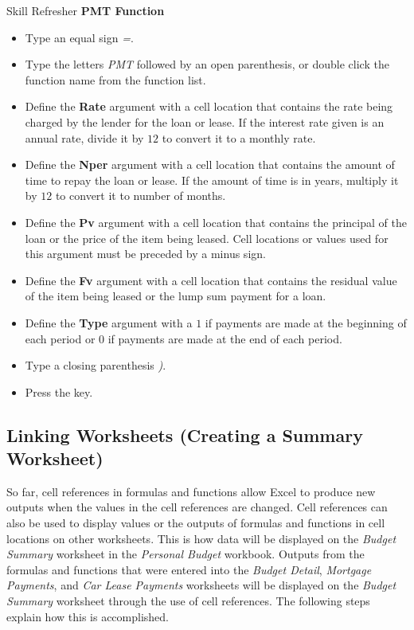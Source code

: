 \begin{center}
	\begin{sklbox}{Skill Refresher}
		\textbf{PMT Function}
		\\
		\begin{itemize}
			\setlength{\itemsep}{0pt}
			\setlength{\parskip}{0pt}
			\setlength{\parsep}{0pt}
			
			\item Type an equal sign \textit{=}.
			\item Type the letters \textit{PMT} followed by an open parenthesis, or double click the function name from the function list.
			\item Define the \textbf{Rate} argument with a cell location that contains the rate being charged by the lender for the loan or lease. If the interest rate given is an annual rate, divide it by $ 12 $ to convert it to a monthly rate.
			\item Define the \textbf{Nper} argument with a cell location that contains the amount of time to repay the loan or lease. If the amount of time is in years, multiply it by $ 12 $ to convert it to number of months.
			\item Define the \textbf{Pv} argument with a cell location that contains the principal of the loan or the price of the item being leased. Cell locations or values used for this argument must be preceded by a minus sign.
			\item Define the \textbf{Fv} argument with a cell location that contains the residual value of the item being leased or the lump sum payment for a loan.
			\item Define the \textbf{Type} argument with a $ 1 $ if payments are made at the beginning of each period or $ 0 $ if payments are made at the end of each period.
			\item Type a closing parenthesis \textit{)}.
			\item Press the  key.
			
		\end{itemize}
	\end{sklbox}
\end{center}

\subsection{Linking Worksheets (Creating a Summary Worksheet)}

So far, cell references in formulas and functions allow Excel to produce new outputs when the values in the cell references are changed. Cell references can also be used to display values or the outputs of formulas and functions in cell locations on other worksheets. This is how data will be displayed on the \textit{Budget Summary} worksheet in the \textit{Personal Budget} workbook. Outputs from the formulas and functions that were entered into the \textit{Budget Detail}, \textit{Mortgage Payments}, and \textit{Car Lease Payments} worksheets will be displayed on the \textit{Budget Summary} worksheet through the use of cell references. The following steps explain how this is accomplished.

